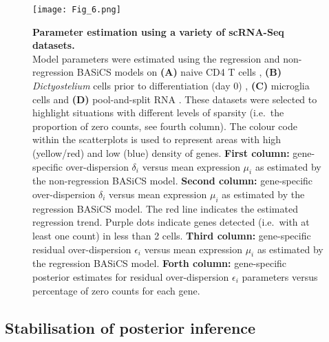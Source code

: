 \newpage

\begin{figure}[!h]
\centering
\texttt{[image: Fig\_6.png]}
\caption[Parameter estimation using a variety of scRNA-Seq datasets]{\textbf{Parameter estimation using a variety of scRNA-Seq datasets.}\\
Model parameters were estimated using the regression and non-regression BASiCS models on \textbf{(A)} naive CD4\plus{} T cells \citep{Martinez-jimenez2017}, \textbf{(B)} \textit{Dictyostelium} cells prior to differentiation (day 0) \citep{Antolovic2017}, \textbf{(C)} microglia cells \citep{Zeisel2015} and \textbf{(D)} pool-and-split RNA \citep{Grun2014}. These datasets were selected to highlight situations with different levels of sparsity (i.e.~the proportion of zero counts, see fourth column). The colour code within the scatterplots is used to represent areas with high (yellow/red) and low (blue) density of genes. \textbf{First column:} gene-specific over-dispersion $\delta_i$ versus mean expression $\mu_i$ as estimated by the non-regression BASiCS model. \textbf{Second column:} gene-specific over-dispersion $\delta_i$ versus mean expression $\mu_i$ as estimated by the regression BASiCS model. The red line indicates the estimated regression trend. Purple dots indicate genes detected (i.e.~with at least one count) in less than 2 cells. \textbf{Third column:} gene-specific residual over-dispersion $\epsilon_i$ versus mean expression $\mu_i$ as estimated by the regression BASiCS model. \textbf{Forth column:} gene-specific posterior estimates for residual over-dispersion $\epsilon_i$ parameters versus percentage of zero counts for each gene.\\}
\label{fig2:datasets}
\end{figure}

\newpage

\subsection{Stabilisation of posterior inference}
\label{sec2:parameter_stabilization}

